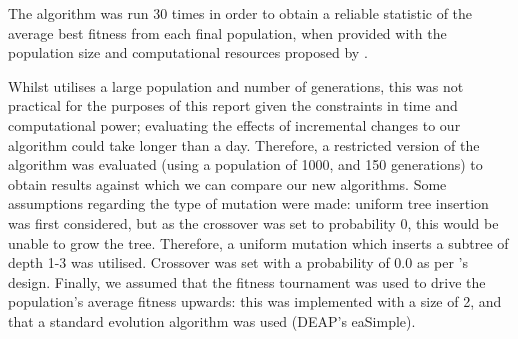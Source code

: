 \documentclass[british,10pt,a4paper]{article}
\begin{document}
The algorithm was run 30 times in order to obtain a reliable statistic of the average best fitness from each final population, when provided with the population size and computational resources proposed by \citeauthor{Ehlis2000-sz}.

Whilst \citeauthor{Ehlis2000-sz} utilises a large population and number of generations, this was not practical for the purposes of this report given the constraints in time and computational power; evaluating the effects of incremental changes to our algorithm could take longer than a day. Therefore, a restricted version of the algorithm was evaluated (using a population of 1000, and 150 generations) to obtain results against which we can compare our new algorithms. Some assumptions regarding the type of mutation were made: uniform tree insertion was first considered, but as the crossover was set to probability 0, this would be unable to grow the tree. Therefore, a uniform mutation which inserts a subtree of depth 1-3 was utilised. Crossover was set with a probability of 0.0 as per \citeauthor{Ehlis2000-sz}'s design. Finally, we assumed that the fitness tournament was used to drive the population's average fitness upwards: this was implemented with a size of 2, and that a standard evolution algorithm was used (DEAP's eaSimple). 
\end{document}
